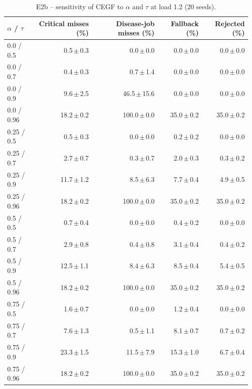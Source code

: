 \begin{table}[htbp]\scriptsize\centering
\caption{E2b -- sensitivity of CEGF to $\alpha$ and $\tau$ at load 1.2 (20 seeds).}\label{tab:e2-thr}
\begin{tabular}{lrrrr}
\toprule
$\alpha$ / $\tau$ & Critical misses (\%) & Disease-job misses (\%) & Fallback (\%) & Rejected (\%) \\
\midrule
0.0 / 0.5 & 0.5\,$\pm$\,0.3 & 0.0\,$\pm$\,0.0 & 0.0\,$\pm$\,0.0 & 0.0\,$\pm$\,0.0 \\
0.0 / 0.7 & 0.4\,$\pm$\,0.3 & 0.7\,$\pm$\,1.4 & 0.0\,$\pm$\,0.0 & 0.0\,$\pm$\,0.0 \\
0.0 / 0.9 & 9.6\,$\pm$\,2.5 & 46.5\,$\pm$\,15.6 & 0.0\,$\pm$\,0.0 & 0.0\,$\pm$\,0.0 \\
0.0 / 0.96 & 18.2\,$\pm$\,0.2 & 100.0\,$\pm$\,0.0 & 35.0\,$\pm$\,0.2 & 35.0\,$\pm$\,0.2 \\
0.25 / 0.5 & 0.5\,$\pm$\,0.3 & 0.0\,$\pm$\,0.0 & 0.2\,$\pm$\,0.2 & 0.0\,$\pm$\,0.0 \\
0.25 / 0.7 & 2.7\,$\pm$\,0.7 & 0.3\,$\pm$\,0.7 & 2.0\,$\pm$\,0.3 & 0.3\,$\pm$\,0.2 \\
0.25 / 0.9 & 11.7\,$\pm$\,1.2 & 8.5\,$\pm$\,6.3 & 7.7\,$\pm$\,0.4 & 4.9\,$\pm$\,0.5 \\
0.25 / 0.96 & 18.2\,$\pm$\,0.2 & 100.0\,$\pm$\,0.0 & 35.0\,$\pm$\,0.2 & 35.0\,$\pm$\,0.2 \\
0.5 / 0.5 & 0.7\,$\pm$\,0.4 & 0.0\,$\pm$\,0.0 & 0.4\,$\pm$\,0.2 & 0.0\,$\pm$\,0.0 \\
0.5 / 0.7 & 2.9\,$\pm$\,0.8 & 0.4\,$\pm$\,0.8 & 3.1\,$\pm$\,0.4 & 0.4\,$\pm$\,0.2 \\
0.5 / 0.9 & 12.5\,$\pm$\,1.1 & 8.4\,$\pm$\,6.3 & 8.5\,$\pm$\,0.4 & 5.4\,$\pm$\,0.5 \\
0.5 / 0.96 & 18.2\,$\pm$\,0.2 & 100.0\,$\pm$\,0.0 & 35.0\,$\pm$\,0.2 & 35.0\,$\pm$\,0.2 \\
0.75 / 0.5 & 1.6\,$\pm$\,0.7 & 0.0\,$\pm$\,0.0 & 1.2\,$\pm$\,0.4 & 0.0\,$\pm$\,0.0 \\
0.75 / 0.7 & 7.6\,$\pm$\,1.3 & 0.5\,$\pm$\,1.1 & 8.1\,$\pm$\,0.7 & 0.7\,$\pm$\,0.2 \\
0.75 / 0.9 & 23.3\,$\pm$\,1.5 & 11.5\,$\pm$\,7.9 & 15.3\,$\pm$\,1.0 & 6.7\,$\pm$\,0.4 \\
0.75 / 0.96 & 18.2\,$\pm$\,0.2 & 100.0\,$\pm$\,0.0 & 35.0\,$\pm$\,0.2 & 35.0\,$\pm$\,0.2 \\
\bottomrule
\end{tabular}
\end{table}